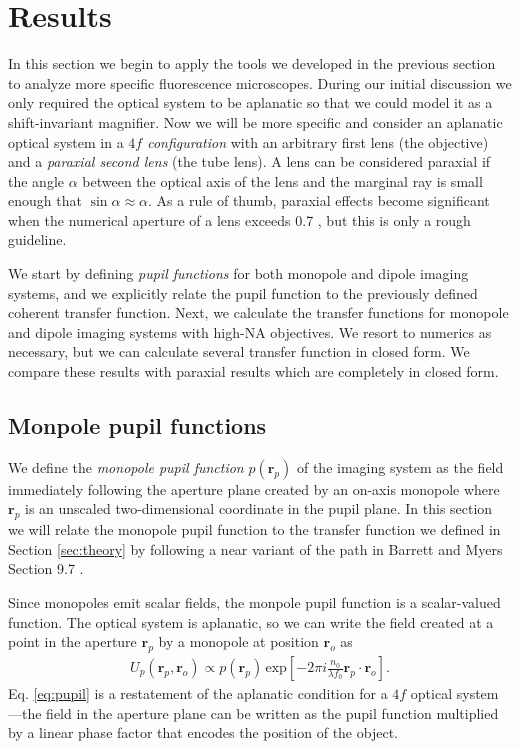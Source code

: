 \documentclass[]{osa-article}
\providecommand{\ro}{\mathbf{\mathbf{r}}_o}
\providecommand{\rp}{\mathbf{r}_p}
\begin{document}
    
\section{Results}\label{sec:results}
In this section we begin to apply the tools we developed in the previous section
to analyze more specific fluorescence microscopes. During our initial discussion
we only required the optical system to be aplanatic so that we could model it as
a shift-invariant magnifier. Now we will be more specific and consider an
aplanatic optical system in a \textit{$4f$ configuration} with an arbitrary
first lens (the objective) and a \textit{paraxial second lens} (the tube lens).
A lens can be considered paraxial if the angle $\alpha$ between the optical axis
of the lens and the marginal ray is small enough that
$\sin\alpha \approx \alpha$. As a rule of thumb, paraxial effects become
significant when the numerical aperture of a lens exceeds 0.7 \cite{gu2000}, but
this is only a rough guideline.

We start by defining \textit{pupil functions} for both monopole and dipole
imaging systems, and we explicitly relate the pupil function to the previously
defined coherent transfer function. Next, we calculate the transfer functions
for monopole and dipole imaging systems with high-NA objectives. We resort to
numerics as necessary, but we can calculate several transfer function in closed
form. We compare these results with paraxial results which are completely in
closed form.

\subsection{Monpole pupil functions}
We define the \textit{monopole pupil function} $p(\rp)$ of the imaging system as
the field immediately following the aperture plane created by an on-axis
monopole where $\rp$ is an unscaled two-dimensional coordinate in the pupil
plane. In this section we will relate the monopole pupil function to the
transfer function we defined in Section \ref{sec:theory} by following a near
variant of the path in Barrett and Myers Section 9.7 \cite{barrett2004}.

Since monopoles emit scalar fields, the monpole pupil function is a
scalar-valued function. The optical system is aplanatic, so we can write the
field created at a point in the aperture $\rp$ by a monopole at position $\ro$
as
\begin{align}
   U_p(\rp, \ro) \propto p(\rp)\,\text{exp}\left[-2\pi i \frac{n_0}{\lambda f_0} \rp\cdot\ro \right]. \label{eq:pupil}
\end{align}
Eq. \ref{eq:pupil} is a restatement of the aplanatic condition for a $4f$
optical system---the field in the aperture plane can be written as the pupil
function multiplied by a linear phase factor that encodes the position of the
object.
\end{document}
